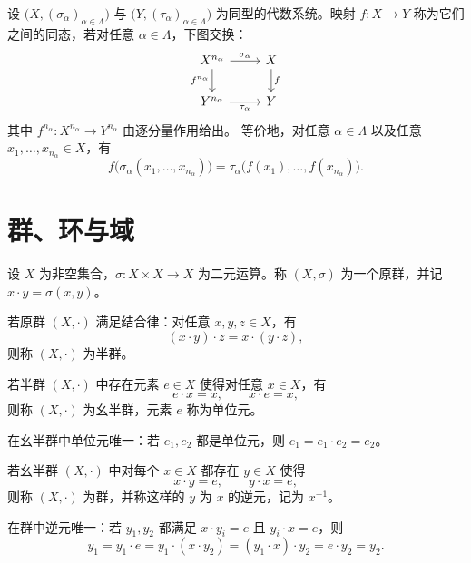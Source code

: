 \documentclass[lang=cn,a4paper,newtx]{elegantbook}
\begin{document}
\begin{definition}[同态与交换图]
设 $\bigl(X,(\sigma_{\alpha})_{\alpha\in\Lambda}\bigr)$ 与 $\bigl(Y,(\tau_{\alpha})_{\alpha\in\Lambda}\bigr)$ 为同型的代数系统。映射 $f:X\to Y$ 称为它们之间的同态，若对任意 $\alpha\in\Lambda$，下图交换：
\[
\begin{tikzcd}
X^{n_{\alpha}} \arrow[r,"\sigma_{\alpha}"] \arrow[d,"f^{n_{\alpha}}"'] & X \arrow[d,"f"] \\
Y^{n_{\alpha}} \arrow[r,"\tau_{\alpha}"'] & Y
\end{tikzcd}
\]
其中 $f^{n_{\alpha}}:X^{n_{\alpha}}\to Y^{n_{\alpha}}$ 由逐分量作用给出。
等价地，对任意 $\alpha\in\Lambda$ 以及任意 $x_1,\dots,x_{n_{\alpha}}\in X$，有
\[
  f\bigl(\sigma_{\alpha}(x_1,\dots,x_{n_{\alpha}})\bigr)=\tau_{\alpha}\bigl(f(x_1),\dots,f(x_{n_{\alpha}})\bigr).
\]
\end{definition}

\section{群、环与域}

\begin{definition}[原群]
设 $X$ 为非空集合，$\sigma:X\times X\to X$ 为二元运算。称 $(X,\sigma)$ 为一个原群，并记 $x\cdot y=\sigma(x,y)$。
\end{definition}

\begin{definition}[半群]
若原群 $(X,\cdot)$ 满足结合律：对任意 $x,y,z\in X$，有
\[
  (x\cdot y)\cdot z=x\cdot (y\cdot z),
\]
则称 $(X,\cdot)$ 为半群。
\end{definition}

\begin{definition}[幺半群]
若半群 $(X,\cdot)$ 中存在元素 $e\in X$ 使得对任意 $x\in X$，有
\[
  e\cdot x=x,\qquad x\cdot e=x,
\]
则称 $(X,\cdot)$ 为幺半群，元素 $e$ 称为单位元。
\end{definition}

\noindent 在幺半群中单位元唯一：若 $e_1,e_2$ 都是单位元，则 $e_1=e_1\cdot e_2=e_2$。

\begin{definition}[群]
若幺半群 $(X,\cdot)$ 中对每个 $x\in X$ 都存在 $y\in X$ 使得
\[
  x\cdot y=e,\qquad y\cdot x=e,
\]
则称 $(X,\cdot)$ 为群，并称这样的 $y$ 为 $x$ 的逆元，记为 $x^{-1}$。
\end{definition}

\noindent 在群中逆元唯一：若 $y_1,y_2$ 都满足 $x\cdot y_i=e$ 且 $y_i\cdot x=e$，则
\[
  y_1=y_1\cdot e=y_1\cdot (x\cdot y_2)=(y_1\cdot x)\cdot y_2=e\cdot y_2=y_2.
\]
\end{document}
